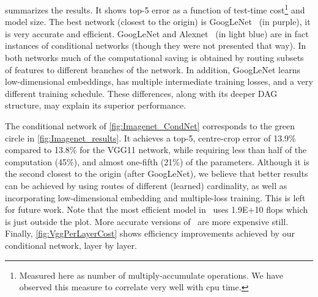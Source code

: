\documentclass[thesis]{subfiles}
\begin{document}
	 summarizes the results.
	It shows top-5 error as a function of test-time 
	cost\footnote{Measured here as number of multiply-accumulate operations. We have observed this measure 
		to correlate very well with \gls{cpu} time.} and model size. 
	The best network (closest to the origin) is GoogLeNet~\citep{Szegedy2014going} (in purple), it is very accurate and efficient. 
	GoogLeNet and Alexnet~\citep{Krizhevsky2012} (in light blue) are in fact instances of conditional networks 
	(though they were not presented that way). In both networks much of the computational saving is obtained by routing
	subsets of features to different branches of the network.
	In addition, GoogLeNet learns low-dimensional embeddings, has multiple intermediate training losses, and a very 
	different training schedule. These differences, along with its deeper DAG structure, may explain its superior performance.
	
	The conditional network of \cref{fig:Imagenet_CondNet} 
	corresponds to the green circle in \cref{fig:Imagenet_results}.
	It achieves a top-5, centre-crop error of
	13.9\% compared to 13.8\% for the VGG11 network, while requiring less than half of the computation (45\%),
	and almost one-fifth (21\%) of the parameters.
	Although it is the second closest to the origin (after GoogLeNet), we believe that better results can be achieved 
	by using routes of different (learned) cardinality, as well as incorporating low-dimensional embedding and multiple-loss training. This is left for future work. 
	Note that the most efficient model in~\citep{He2015b} uses 1.9E+10 flops which is just outside the plot. 
	More accurate versions of~\citep{He2015b} are more expensive still.
	Finally, \cref{fig:VggPerLayerCost} shows efficiency improvements achieved by our conditional network, layer by layer.
	
\end{document}
